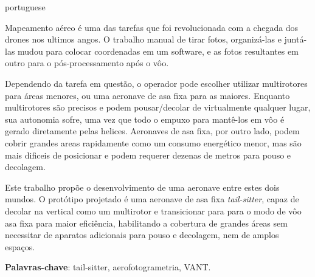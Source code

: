 
\setlength{\absparsep}{18pt} %
\begin{resumo}[Resumo]
 \begin{otherlanguage*}{portuguese}

Mapeamento aéreo é uma das tarefas que foi revolucionada com a chegada dos drones nos ultimos angos.
%
O trabalho manual de tirar fotos, organizá-las e juntá-las mudou para colocar coordenadas em um software, e as fotos resultantes em outro para o pós-processamento após o vôo.
%

Dependendo da tarefa em questão, o operador pode escolher utilizar multirotores para áreas menores, ou uma aeronave de asa fixa para as maiores.
%
Enquanto multirotores são precisos e podem pousar/decolar de virtualmente qualquer lugar, sua autonomia sofre, uma vez que todo o empuxo para mantê-los em vôo é gerado diretamente pelas helices.
%
Aeronaves de asa fixa, por outro lado, podem cobrir grandes areas rapidamente como um consumo energético menor, mas são mais dificeis de posicionar e podem requerer dezenas de metros para pouso e decolagem.

%
Este trabalho propõe o desenvolvimento de uma aeronave entre estes dois mundos.
%
O protótipo projetado é uma aeronave de asa fixa \textit{tail-sitter}, capaz de decolar na vertical como um multirotor e transicionar para para o modo de vôo asa fixa para maior eficiência, habilitando a cobertura de grandes áreas sem necessitar de aparatos adicionais para pouso e decolagem, nem de amplos espaços.
%

 \textbf{Palavras-chave}: tail-sitter, aerofotogrametria, VANT.
  \end{otherlanguage*}
\end{resumo}

